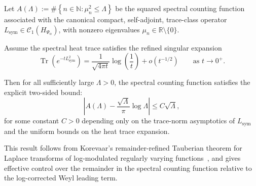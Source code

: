 \begin{lemma}
\label{lem:explicit_korevaar_tauberian_bound}
Let \( A(\Lambda) := \#\left\{ n \in \mathbb{N} : \mu_n^2 \le \Lambda \right\} \) be the squared spectral counting function associated with the canonical compact, self-adjoint, trace-class operator \( L_{\mathrm{sym}} \in \mathcal{C}_1(H_{\Psi_\alpha}) \), with nonzero eigenvalues \( \mu_n \in \mathbb{R} \setminus \{0\} \).

Assume the spectral heat trace satisfies the refined singular expansion
\[
\operatorname{Tr}(e^{-t L_{\mathrm{sym}}^2}) = \frac{1}{\sqrt{4\pi t}} \log\left( \frac{1}{t} \right) + o(t^{-1/2}) \qquad \text{as } t \to 0^+.
\]

Then for all sufficiently large \( \Lambda > 0 \), the spectral counting function satisfies the explicit two-sided bound:
\[
\left| A(\Lambda) - \frac{\sqrt{\Lambda}}{\pi} \log \Lambda \right| \le C \sqrt{\Lambda},
\]
for some constant \( C > 0 \) depending only on the trace-norm asymptotics of \( L_{\mathrm{sym}} \) and the uniform bounds on the heat trace expansion.

\medskip
\noindent
This result follows from Korevaar’s remainder-refined Tauberian theorem for Laplace transforms of log-modulated regularly varying functions~\cite[Ch.~III, §5]{Korevaar2004Tauberian}, and gives effective control over the remainder in the spectral counting function relative to the log-corrected Weyl leading term.
\end{lemma}
